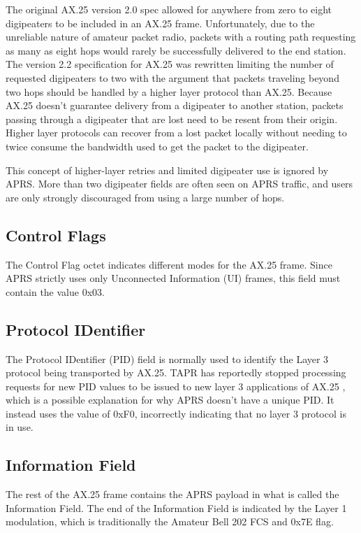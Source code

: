 The original AX.25 version 2.0 spec allowed for anywhere from zero to eight digipeaters to
be included in an AX.25 frame. Unfortunately, due to the unreliable nature of amateur 
packet radio, packets with a routing path requesting as many as eight hops would rarely be 
successfully delivered to the end station.
The version 2.2 specification for AX.25 was
rewritten limiting the number of requested digipeaters to two with the argument that packets
traveling beyond two hops should be handled by a higher layer protocol than AX.25.
Because AX.25 doesn't guarantee delivery from a digipeater to another station,
packets passing through a digipeater that are lost need to be
resent from their origin.
Higher layer protocols can recover from a lost packet locally 
without needing to twice consume
the bandwidth used to get the packet to the digipeater.

This concept of higher-layer retries and limited digipeater use is ignored by APRS.
More than two digipeater fields are often seen on APRS traffic, 
and users are only strongly discouraged from using a large number of hops.

\subsection{Control Flags}

The Control Flag octet indicates different modes for the AX.25 frame.
Since APRS strictly uses only Unconnected Information (UI) frames, this field must
contain the value 0x03.

\subsection{Protocol IDentifier}

The Protocol IDentifier (PID) field is normally used to identify the Layer 3 protocol
being transported by AX.25. TAPR has reportedly stopped processing requests for new PID
values to be issued to new layer 3 applications of AX.25 \cite{millernopid}, 
which is a possible explanation for why APRS doesn't have a unique PID.
It instead uses the value of 0xF0, incorrectly indicating that no layer 3 protocol is in use.

\subsection{Information Field}

The rest of the AX.25 frame contains the APRS payload in
what is called the Information Field.
The end of the Information Field is indicated by the Layer 1 modulation, which is traditionally
the Amateur Bell 202 FCS and 0x7E flag.

